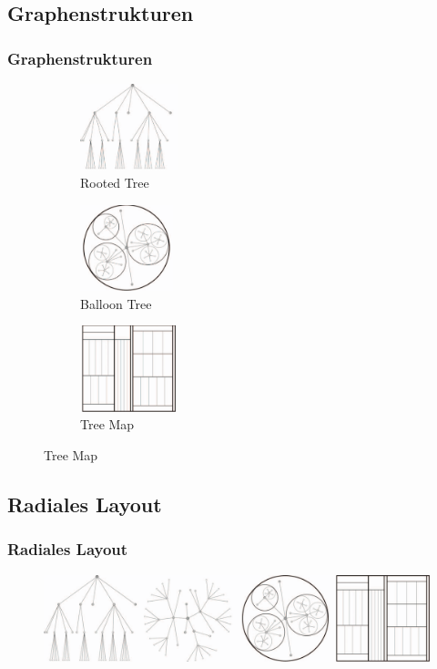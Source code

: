 \documentclass[11pt]{beamer}
\begin{document}
\subsection{Graphenstrukturen}
\begin{frame}
\frametitle{Graphenstrukturen}

\begin{figure}[c]
 
\begin{subfigure}{0.25\linewidth}
\includegraphics[width=\linewidth, height=2.5cm]{./HierachicalTree.png} 
\caption{Rooted Tree}

\end{subfigure}
 \begin{subfigure}{0.25\linewidth}
\includegraphics[width=\linewidth, height=2.5cm]{./BalloonTree.png}
\caption{Balloon Tree}

\end{subfigure}
 \begin{subfigure}{0.25\linewidth}
\includegraphics[width=\linewidth, height=2.5cm]{./TreeMap.png}
\caption{Tree Map}
\end{subfigure}
\end{figure}
\end{frame}

\subsection{Radiales Layout}
\begin{frame}
\frametitle{Radiales Layout}
\begin{figure}
\centering
\includegraphics[width=0.6\linewidth]{./TreeTypes.png}
\end{figure}
\end{frame}
\end{document}
